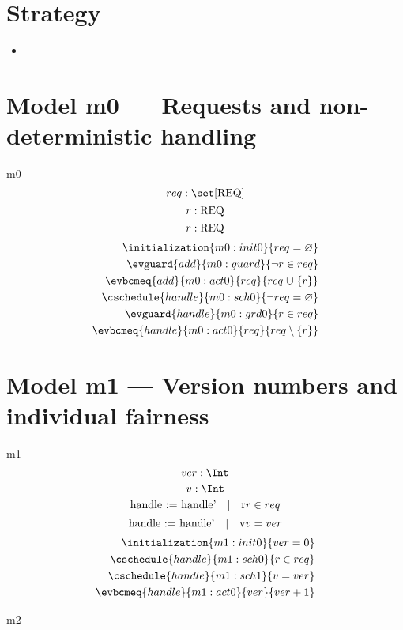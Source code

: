 \documentclass[12pt]{amsart}
\newcommand{\REQ}{\text{REQ}}
\begin{document}
\section{Strategy}

\begin{itemize}
  \item 
\end{itemize}
\section{Model m0 --- Requests and non-deterministic handling}
\begin{machine}{m0}
  \newset{\REQ}
  \[ \variable{ req : \set [\REQ] } \]
  \[ \param{add}{ r : \REQ } \]
  \[ \param{handle}{ r : \REQ } \]
  \begin{align*}
      \initialization{m0:init0}{ req = \emptyset } \\
      \evguard{add}{m0:guard}{ \neg r \in req } \\
      \evbcmeq{add}{m0:act0}{req}{ req \bunion \{ r \} } \\
      \cschedule{handle}{m0:sch0}{ \neg req = \emptyset } \\
      \evguard{handle}{m0:grd0}{ r \in req } \\
      \evbcmeq{handle}{m0:act0}{req}{ req \setminus \{ r \} } 
  \end{align*}

\noindent
\end{machine}
\section{Model m1 --- Version numbers and individual fairness}
\begin{machine}{m1}
  \[ \variable{ ver : \Int } \]
  \[ \indices{handle}{ v : \Int } \]
  \[\witness{handle}{r}{r \in req}\]
  \[\witness{handle}{v}{v = ver}\]
  \begin{align}
      \initialization{m1:init0}{ ver = 0 } \\
      \cschedule{handle}{m1:sch0}{ r \in req } \\
      \cschedule{handle}{m1:sch1}{ v = ver } \\
      \evbcmeq{handle}{m1:act0}{ver}{ ver + 1 } 
  \end{align}
\end{machine}

\begin{machine}{m2}
\end{machine}
\end{document}
